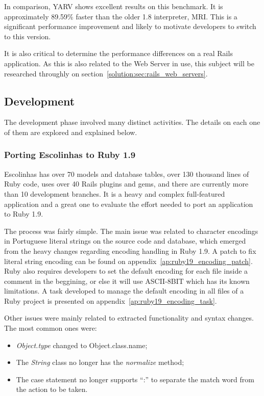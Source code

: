 In comparison, YARV shows excellent results on this benchmark. It is approximately 89.59\% faster than the older 1.8 interpreter, MRI. This is a significant performance improvement and likely to motivate developers to switch to this version.

It is also critical to determine the performance differences on a real Rails application. As this is also related to the Web Server in use, this subject will be researched throughly on section~\ref{solution:sec:rails_web_servers}.


\subsection{Development}
The development phase involved many distinct activities. The details on each one of them are explored and explained below.

\subsubsection{Porting Escolinhas to Ruby 1.9}
Escolinhas has over 70 models and database tables, over 130 thousand lines of Ruby code, uses over 40 Rails plugins and gems, and there are currently more than 10 development branches. It is a heavy and complex full-featured application and a great one to evaluate the effort needed to port an application to Ruby 1.9.

The process was fairly simple. The main issue was related to character encodings in Portuguese literal strings on the source code and database, which emerged from the heavy changes regarding encoding handling in Ruby 1.9. A patch to fix literal string encoding can be found on appendix~\ref{ap:ruby19_encoding_patch}. Ruby also requires developers to set the default encoding for each file inside a comment in the beggining, or else it will use ASCII-8BIT which has its known limitations. A task developed to manage the default encoding in all files of a Ruby project is presented on appendix~\ref{ap:ruby19_encoding_task}.

Other issues were mainly related to extracted functionality and syntax changes. The most common ones were:
\begin{itemize}
  \item \textit{Object.type} changed to {Object.class.name};
  \item The \textit{String} class no longer has the \textit{normalize} method;
  \item The case statement no longer supports ``:'' to separate the match word from the action to be taken.
\end{itemize}

